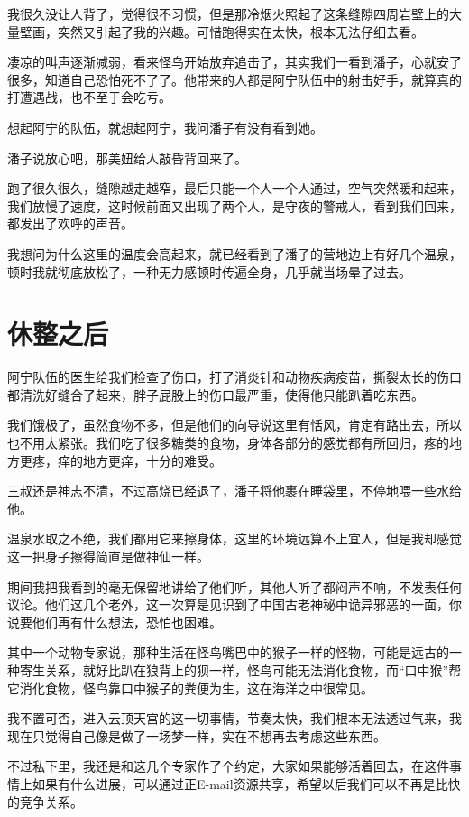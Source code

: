 我很久没让人背了，觉得很不习惯，但是那冷烟火照起了这条缝隙四周岩壁上的大量壁画，突然又引起了我的兴趣。可惜跑得实在太快，根本无法仔细去看。

凄凉的叫声逐渐减弱，看来怪鸟开始放弃追击了，其实我们一看到潘子，心就安了很多，知道自己恐怕死不了了。他带来的人都是阿宁队伍中的射击好手，就算真的打遭遇战，也不至于会吃亏。

想起阿宁的队伍，就想起阿宁，我问潘子有没有看到她。

潘子说放心吧，那美妞给人敲昏背回来了。

跑了很久很久，缝隙越走越窄，最后只能一个人一个人通过，空气突然暖和起来，我们放慢了速度，这时候前面又出现了两个人，是守夜的警戒人，看到我们回来，都发出了欢呼的声音。

我想问为什么这里的温度会高起来，就已经看到了潘子的营地边上有好几个温泉，顿时我就彻底放松了，一种无力感顿时传遍全身，几乎就当场晕了过去。

\chapter{休整之后}

阿宁队伍的医生给我们检查了伤口，打了消炎针和动物疾病疫苗，撕裂太长的伤口都清洗好缝合了起来，胖子屁股上的伤口最严重，使得他只能趴着吃东西。

我们饿极了，虽然食物不多，但是他们的向导说这里有恬风，肯定有路出去，所以也不用太紧张。我们吃了很多糖类的食物，身体各部分的感觉都有所回归，疼的地方更疼，痒的地方更痒，十分的难受。

三叔还是神志不清，不过高烧已经退了，潘子将他裹在睡袋里，不停地喂一些水给他。

温泉水取之不绝，我们都用它来擦身体，这里的环境远算不上宜人，但是我却感觉这一把身子擦得简直是做神仙一样。

期间我把我看到的毫无保留地讲给了他们听，其他人听了都闷声不响，不发表任何议论。他们这几个老外，这一次算是见识到了中国古老神秘中诡异邪恶的一面，你说要他们再有什么想法，恐怕也困难。

其中一个动物专家说，那种生活在怪鸟嘴巴中的猴子一样的怪物，可能是远古的一种寄生关系，就好比趴在狼背上的狈一样，怪鸟可能无法消化食物，而“口中猴”帮它消化食物，怪鸟靠口中猴子的粪便为生，这在海洋之中很常见。

我不置可否，进入云顶天宫的这一切事情，节奏太快，我们根本无法透过气来，我现在只觉得自己像是做了一场梦一样，实在不想再去考虑这些东西。

不过私下里，我还是和这几个专家作了个约定，大家如果能够活着回去，在这件事情上如果有什么进展，可以通过正E-mail资源共享，希望以后我们可以不再是比快的竞争关系。

